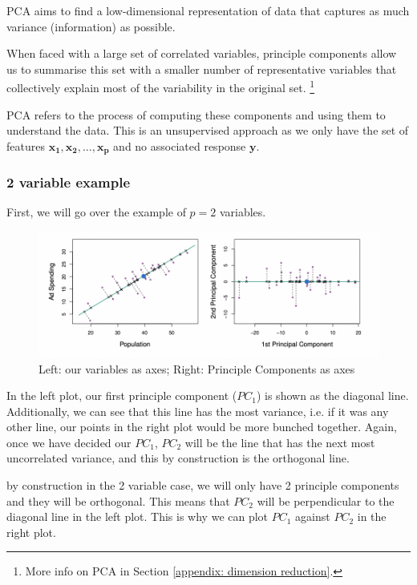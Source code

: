 \documentclass[11pt]{article}
\begin{document}
PCA aims to find a low-dimensional representation of data that captures as much variance (information) as possible.

When faced with a large set of correlated variables, principle components allow us to summarise this set with a smaller number of representative variables that collectively explain most of the variability in the original set. \footnote{More info on PCA in Section \ref{appendix: dimension reduction}.}

PCA refers to the process of computing these components and using them to understand the data. This is an unsupervised approach as we only have the set of features $\mathbf{x_1, x_2, \ldots, x_p}$ and no associated response $\mathbf{y}$.

\subsubsection{2 variable example}

First, we will go over the example of $p=2$ variables.

\begin{figure}[h]
    \centering
    \includegraphics{pic/pca 2p.png}
    \caption{Left: our variables as axes; Right: Principle Components as axes}
    \label{fig:pca2}
\end{figure}

In the left plot, our first principle component ($PC_1$) is shown as the diagonal line. Additionally, we can see that this line has the most variance, i.e. if it was any other line, our points in the right plot would be more bunched together. Again, once we have decided our $PC_1$, $PC_2$ will be the line that has the next most uncorrelated variance, and this by construction is the orthogonal line.

\begin{note}
    by construction in the 2 variable case, we will only have 2 principle components and they will be orthogonal. This means that $PC_2$ will be perpendicular to the diagonal line in the left plot. This is why we can plot $PC_1$ against $PC_2$ in the right plot.
\end{note}
\end{document}
